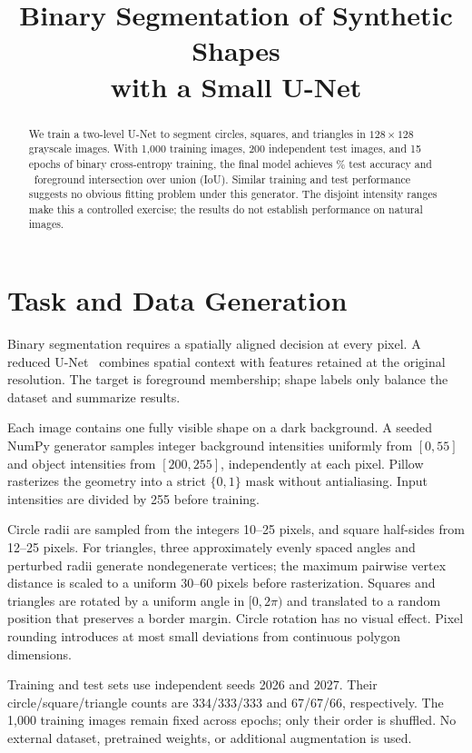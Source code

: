 \documentclass[conference]{IEEEtran}
\title{Binary Segmentation of Synthetic Shapes\protect\\with a Small U-Net}
\author{\IEEEauthorblockN{Keru Chen}
\IEEEauthorblockA{Arizona State University\\Assignment 3: U-Net Segmentation\StudentLine}}
\begin{document}
\maketitle
\begin{abstract}
We train a two-level U-Net to segment circles, squares, and triangles in $128\times128$ grayscale images. With 1,000 training images, 200 independent test images, and 15 epochs of binary cross-entropy training, the final model achieves \TestAcc\% test accuracy and \TestIoU\ foreground intersection over union (IoU). Similar training and test performance suggests no obvious fitting problem under this generator. The disjoint intensity ranges make this a controlled exercise; the results do not establish performance on natural images.
\end{abstract}



\section{Task and Data Generation}
Binary segmentation requires a spatially aligned decision at every pixel. A reduced U-Net~\cite{unet} combines spatial context with features retained at the original resolution. The target is foreground membership; shape labels only balance the dataset and summarize results.

Each image contains one fully visible shape on a dark background. A seeded NumPy generator samples integer background intensities uniformly from $[0,55]$ and object intensities from $[200,255]$, independently at each pixel. Pillow rasterizes the geometry into a strict $\{0,1\}$ mask without antialiasing. Input intensities are divided by 255 before training.

Circle radii are sampled from the integers 10--25 pixels, and square half-sides from 12--25 pixels. For triangles, three approximately evenly spaced angles and perturbed radii generate nondegenerate vertices; the maximum pairwise vertex distance is scaled to a uniform 30--60 pixels before rasterization. Squares and triangles are rotated by a uniform angle in $[0,2\pi)$ and translated to a random position that preserves a border margin. Circle rotation has no visual effect. Pixel rounding introduces at most small deviations from continuous polygon dimensions.

Training and test sets use independent seeds 2026 and 2027. Their circle/square/triangle counts are 334/333/333 and 67/67/66, respectively. The 1,000 training images remain fixed across epochs; only their order is shuffled. No external dataset, pretrained weights, or additional augmentation is used.
\end{document}
